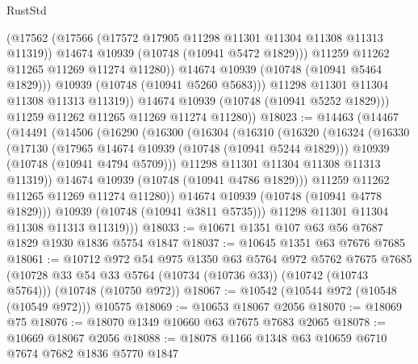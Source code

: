 \begin{lexlean}{RustStd}
\begin{coremodule}
                      (@17562
                        (@17566 (@17572 @17905 @11298 @11301 @11304 @11308 @11313 @11319))
                        @14674
                        @10939
                        (@10748 (@10941 @5472 @1829)))
                      @11259
                      @11262
                      @11265
                      @11269
                      @11274
                      @11280))
                  @14674
                  @10939
                  (@10748 (@10941 @5464 @1829)))
                @10939
                (@10748 (@10941 @5260 @5683)))
              @11298
              @11301
              @11304
              @11308
              @11313
              @11319))
          @14674
          @10939
          (@10748 (@10941 @5252 @1829)))
        @11259
        @11262
        @11265
        @11269
        @11274
        @11280))
@18023 := @14463
    (@14467
      (@14491
        (@14506
          (@16290
            (@16300
              (@16304
                (@16310
                  (@16320
                    (@16324
                      (@16330
                        (@17130
                          (@17965 @14674 @10939 (@10748 (@10941 @5244 @1829)))
                          @10939
                          (@10748 (@10941 @4794 @5709)))
                        @11298
                        @11301
                        @11304
                        @11308
                        @11313
                        @11319))
                    @14674
                    @10939
                    (@10748 (@10941 @4786 @1829)))
                  @11259
                  @11262
                  @11265
                  @11269
                  @11274
                  @11280))
              @14674
              @10939
              (@10748 (@10941 @4778 @1829)))
            @10939
            (@10748 (@10941 @3811 @5735)))
          @11298
          @11301
          @11304
          @11308
          @11313
          @11319)))
@18033 := @10671 @1351 @107 @63 @56 @7687 @1829 @1930 @1836 @5754 @1847
@18037 := @10645 @1351 @63 @7676 @7685
@18061 := @10712
    @972
    @54
    @975
    @1350
    @63
    @5764
    @972
    @5762
    @7675
    @7685
    (@10728 @33 @54 @33 @5764 (@10734 (@10736 @33)) (@10742 (@10743 @5764)))
    (@10748 (@10750 @972))
@18067 := @10542 (@10544 @972 (@10548 (@10549 @972))) @10575
@18069 := @10653 @18067 @2056
@18070 := @18069 @75
@18076 := @18070 @1349 @10660 @63 @7675 @7683 @2065
@18078 := @10669 @18067 @2056
@18088 := @18078 @1166 @1348 @63 @10659 @6710 @7674 @7682 @1836 @5770 @1847

\end{coremodule}
\end{lexlean}
